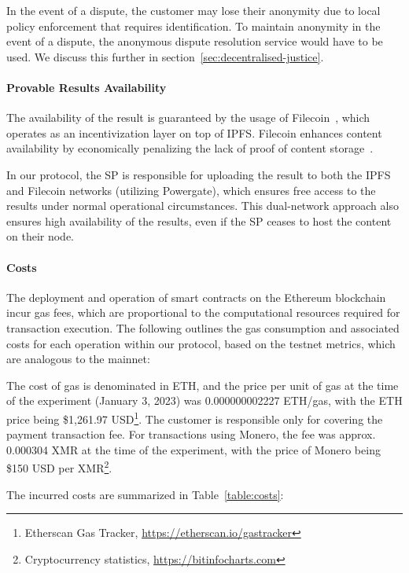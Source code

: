 \documentclass[pdftex,twocolumn,epjc3]{svjour3}
\begin{document}
In the event of a dispute, the customer may lose their anonymity due to local policy enforcement that requires identification. To maintain anonymity in the event of a dispute, the anonymous dispute resolution service would have to be used. We discuss this further in section~\ref{sec:decentralised-justice}.

\paragraph{Provable Results Availability}\label{sec:provable-results-availability}
The availability of the result is guaranteed by the usage of Filecoin~\cite{protocollabsFilecoinDecentralizedStorage2017}, which operates as an incentivization layer on top of IPFS. Filecoin enhances content availability by economically penalizing the lack of proof of content storage~\cite{filecoinSlashing}.

In our protocol, the SP is responsible for uploading the result to both the IPFS and Filecoin networks (utilizing Powergate), which ensures free access to the results under normal operational circumstances. This dual-network approach also ensures high availability of the results, even if the SP ceases to host the content on their node.

\paragraph{Costs}
The deployment and operation of smart contracts on the Ethereum blockchain incur gas fees, which are proportional to the computational resources required for transaction execution. The following outlines the gas consumption and associated costs for each operation within our protocol, based on the testnet metrics, which are analogous to the mainnet:

The cost of gas is denominated in ETH, and the price per unit of gas at the time of the experiment (January 3, 2023) was 0.000000002227 ETH/gas, with the ETH price being \$1,261.97 USD\footnote{Etherscan Gas Tracker, \url{https://etherscan.io/gastracker}}. The customer is responsible only for covering the payment transaction fee. For transactions using Monero, the fee was approx. 0.000304 XMR at the time of the experiment, with the price of Monero being \$150 USD per XMR\footnote{Cryptocurrency statistics, \url{https://bitinfocharts.com}}.

The incurred costs are summarized in Table~\ref{table:costs}:
\end{document}
